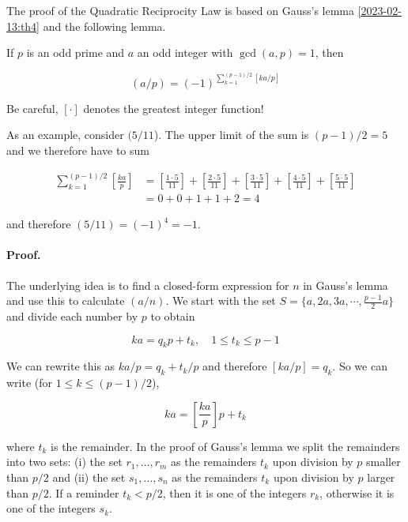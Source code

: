 
The proof of the Quadratic Reciprocity Law is based on Gauss's lemma \ref{2023-02-13:th4} and the following lemma.

\begin{theorem}
    If $p$ is an odd prime and $a$ an odd integer with $\gcd(a,p)=1$, then

    \begin{equation*}
        (a/p) = (-1)^{\sum_{k=1}^{(p-1)/2} [ka/p]}
    \end{equation*}

    Be careful, $[ \cdot ]$ denotes the greatest integer function!
\end{theorem}

As an example, consider $(5/11$). The upper limit of the sum is $(p-1)/2 = 5$ and we therefore have to sum

\begin{align*}
\sum_{k=1}^{(p-1)/2} \left[ \frac{ka}{p} \right] &= \left[ \frac{1 \cdot 5}{11} \right] + \left[ \frac{2 \cdot 5}{11} \right] + \left[ \frac{3 \cdot 5}{11} \right] + \left[ \frac{4 \cdot 5}{11} \right] + \left[ \frac{5 \cdot 5}{11} \right] \\
&= 0 + 0 + 1 + 1 + 2 = 4
\end{align*}

and therefore $(5/11) = (-1)^4 = -1$.

\paragraph{Proof.} The underlying idea is to find a closed-form expression for $n$ in Gauss's lemma and use this to calculate $(a/n)$. We start with the set $S = \{a, 2a, 3a, \cdots, \frac{p-1}{2}a \}$ and divide each number by $p$ to obtain

\begin{equation*}
    ka = q_k p + t_k, \quad 1 \leq t_k \leq p-1
\end{equation*}

We can rewrite this as $ka/p = q_k + t_k / p$ and therefore $[ka/p] = q_k$. So we can write (for $1 \leq k \leq (p-1)/2$),

\begin{equation*}
    ka = \left[ \frac{ka}{p} \right] p + t_k
\end{equation*}

where $t_k$ is the remainder. In the proof of Gauss's lemma we split the remainders into two sets: (i) the set $r_1, \ldots, r_m$ as the remainders $t_k$ upon division by $p$ smaller than $p/2$ and (ii) the set $s_1, \ldots, s_n$ as the remainders $t_k$ upon division by $p$ larger than $p/2$. If a reminder $t_k < p/2$, then it is one of the integers $r_k$, otherwise it is one of the integers $s_k$.

